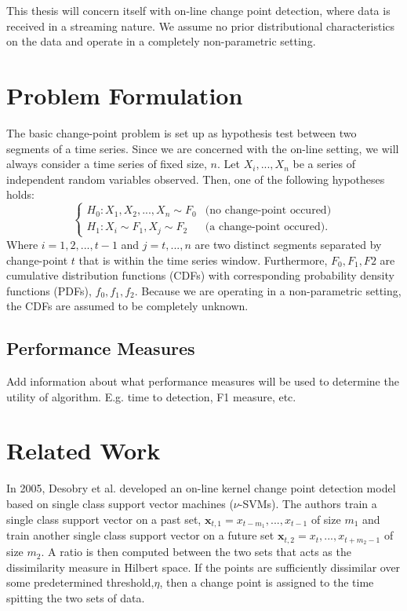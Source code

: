 This thesis will concern itself with on-line change point detection, where data is received in a streaming nature. We assume no prior distributional characteristics on the data and operate in a completely non-parametric setting. 

\section{Problem Formulation}
The basic change-point problem is set up as hypothesis test between two segments of a time series. Since we are concerned with the on-line setting, we will always consider a time series of fixed size, $n$.  Let $X_i,...,X_n$ be a series of independent random variables observed. Then, one of the following hypotheses holds:
\begin{equation}
  \begin{cases}
    H_0: X_1, X_2, ...,X_n \sim  F_0 & \text{(no change-point occured)} \\
    H_1: X_i \sim F_1, X_j \sim F_2 & \text{(a change-point occured)}. 
  \end{cases}
\end{equation}
Where $i=1,2,...,t-1$ and $j=t,...,n$  are two distinct segments separated by change-point $t$ that is within the time series window. Furthermore, $F_0, F_1,F2$ are cumulative distribution functions (CDFs) with corresponding probability density functions (PDFs), $f_0, f_1, f_2$. Because we are operating in a non-parametric setting, the CDFs are assumed to be completely unknown.

\subsection{Performance Measures}
Add information about what performance measures will be used to determine the utility of algorithm. E.g. time to detection, F1 measure, etc.

\section{Related Work}

In 2005, Desobry et al. \cite{desobry2005online} developed an on-line kernel change point detection model based on single class support vector machines ($\nu$-SVMs). The authors train a single class support vector on a past set, $\mathbf{x}_{t,1}={x_{t-m_1},...,x_{t-1}}$ of size $m_1$ and train another single class support vector on a future set $\mathbf{x}_{t,2}={x_t,...,x_{t+m_2-1}}$ of size $m_2$. A ratio is then computed between the two sets that acts as the dissimilarity measure in Hilbert space. If the points are sufficiently dissimilar over some predetermined threshold,$\eta$, then a change point is assigned to the time spitting the two sets of data.%

